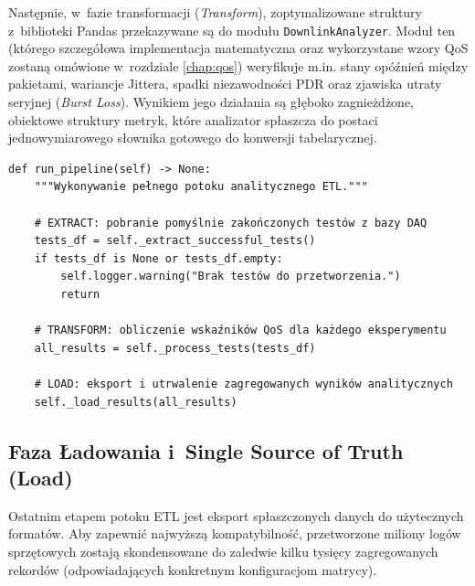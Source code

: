 Następnie, w~fazie transformacji (\textit{Transform}), zoptymalizowane struktury z~biblioteki Pandas przekazywane są do modułu \texttt{DownlinkAnalyzer}.
Moduł ten (którego szczegółowa implementacja matematyczna oraz wykorzystane wzory QoS zostaną omówione w~rozdziale \ref{chap:qos}) weryfikuje m.in. stany opóźnień między pakietami, wariancje Jittera, spadki niezawodności PDR oraz zjawiska utraty seryjnej (\textit{Burst Loss}).
Wynikiem jego działania są głęboko zagnieżdżone, obiektowe struktury metryk, które analizator spłaszcza do postaci jednowymiarowego słownika gotowego do konwersji tabelarycznej.

\begin{listing}[htbp]
    \caption{Struktura autorskiego rurociągu analitycznego opartego na paradygmacie ETL (\texttt{batch\_analyzer.py}) \cite{espy_nexus_python_host}.}
    \label{lst:etl_pipeline}
    \begin{verbatim}
def run_pipeline(self) -> None:
    """Wykonywanie pełnego potoku analitycznego ETL."""
    
    # EXTRACT: pobranie pomyślnie zakończonych testów z bazy DAQ
    tests_df = self._extract_successful_tests()
    if tests_df is None or tests_df.empty:
        self.logger.warning("Brak testów do przetworzenia.")
        return

    # TRANSFORM: obliczenie wskaźników QoS dla każdego eksperymentu
    all_results = self._process_tests(tests_df)

    # LOAD: eksport i utrwalenie zagregowanych wyników analitycznych
    self._load_results(all_results)
\end{verbatim}
\end{listing}

\subsection{Faza Ładowania i~Single Source of Truth (Load)}
Ostatnim etapem potoku ETL jest eksport spłaszczonych danych do użytecznych formatów.
Aby zapewnić najwyższą kompatybilność, przetworzone miliony logów sprzętowych zostają skondensowane do zaledwie kilku tysięcy zagregowanych rekordów (odpowiadających konkretnym konfiguracjom matrycy).

